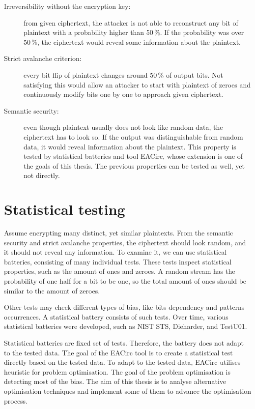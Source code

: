\documentclass[
  print, %
  Table,   %
  nolof,     %
  nolot,     %
  11pt, %
  oneside  %
]{fithesis3}
\begin{document}
\begin{description}
    \item[Irreversibility without the encryption key:] from given ciphertext, the attacker is not able to reconstruct any bit of plaintext with a probability higher than 50\,\%. If the probability was over 50\,\%, the ciphertext would reveal some information about the plaintext.

    \item[Strict avalanche criterion:] every bit flip of plaintext changes around 50\,\% of output bits. Not satisfying this would allow an attacker to start with plaintext of zeroes and continuously modify bits one by one to approach given ciphertext.

    \item[Semantic security:] even though plaintext usually does not look like random data, the ciphertext has to look so. If the output was distinguishable from random data, it would reveal information about the plaintext. This property is tested by statistical batteries and tool EACirc, whose extension is one of the goals of this thesis. The previous properties can be tested as well, yet not directly.
\end{description}


\section{Statistical testing}
\label{sec:stat-testing}

Assume encrypting many distinct, yet similar plaintexts. From the semantic security and strict avalanche properties, the ciphertext should look random, and it should not reveal any information. To examine it, we can use statistical batteries, consisting of many individual tests. These tests inspect statistical properties, such as the amount of ones and zeroes. A random stream has the probability of one half for a bit to be one, so the total amount of ones should be similar to the amount of zeroes.

Other tests may check different types of bias, like bits dependency and patterns occurrences. A statistical battery consists of such tests. Over time, various statistical batteries were developed, such as NIST STS, Dieharder, and TestU01.

Statistical batteries are fixed set of tests. Therefore, the battery does not adapt to the tested data. The goal of the EACirc tool is to create a statistical test directly based on the tested data. To adapt to the tested data, EACirc utilises heuristic for problem optimisation. The goal of the problem optimisation is detecting most of the bias. The aim of this thesis is to analyse alternative optimisation techniques and implement some of them to advance the optimisation process.
\end{document}
